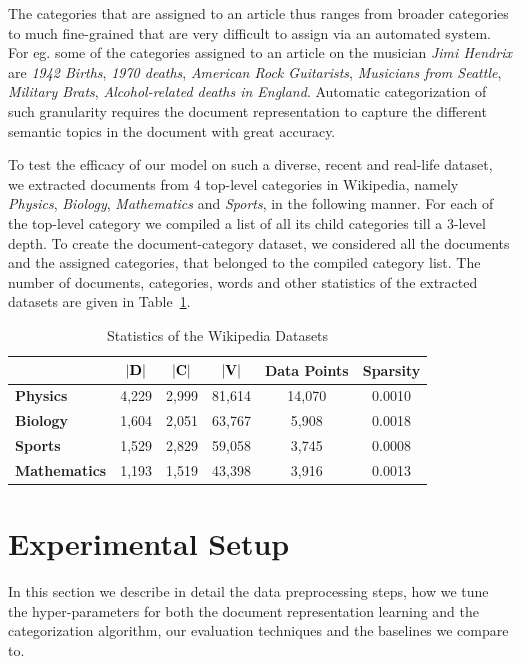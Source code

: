 The categories that are assigned to an article thus ranges from broader categories to much fine-grained that are very difficult to assign via an automated system. For eg. some of the categories assigned to an article on the musician \emph{Jimi Hendrix} are \emph{1942 Births}, \emph{1970 deaths}, \emph{American Rock Guitarists}, \emph{Musicians from Seattle}, \emph{Military Brats}, \emph{Alcohol-related deaths in England}. Automatic categorization of such granularity requires the document representation to capture the different semantic topics in the document with great accuracy.

To test the efficacy of our model on such a diverse, recent and real-life dataset, we extracted documents from 4 top-level categories in Wikipedia, namely \emph{Physics}, \emph{Biology}, \emph{Mathematics} and \emph{Sports}, in the following manner. For each of the top-level category we compiled a list of all its child categories till a 3-level depth. To create the document-category dataset, we considered all the documents and the assigned categories, that belonged to the compiled category list. The number of documents, categories, words and other statistics of the extracted datasets are given in Table~\ref{wiki:data:stat}.

\begin{table}[h!]
\begin{center}
\begin{tabular}{l c c c c c} %
\toprule
& \textbf{$|\mathbf{D}|$} & \textbf{$|\mathbf{C}|$} & \textbf{$|\mathbf{V}|$} & \textbf{Data Points} & \textbf{Sparsity}\\
\midrule
\textbf{Physics}		& 4,229 & 2,999 & 81,614 & 14,070 & 0.0010 \\
\textbf{Biology}		& 1,604 & 2,051 & 63,767 & 5,908 & 0.0018 \\
\textbf{Sports}			& 1,529 & 2,829 & 59,058 & 3,745 & 0.0008 \\
\textbf{Mathematics}	& 1,193 & 1,519 & 43,398 & 3,916 & 0.0013 \\
\bottomrule         
\end{tabular}
\caption{\label{wiki:data:stat}Statistics of the Wikipedia Datasets}
\end{center}
\end{table}

\section{Experimental Setup}
\label{sec:exp_setup}
In this section we describe in detail the data preprocessing steps, how we tune the hyper-parameters for both the document representation learning and the categorization algorithm, our evaluation techniques and the baselines we compare to.

